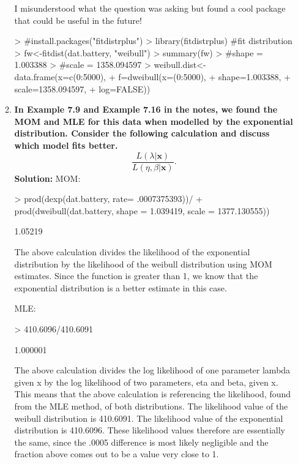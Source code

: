 \documentclass{article}
\begin{document}
\begin{enumerate}
\begin{enumerate}
I misunderstood what the question was asking but found a cool package that could be useful in the future!
\begin{Schunk}
\begin{Sinput}
> #install.packages("fitdistrplus")
> library(fitdistrplus) #fit distribution
> fw<-fitdist(dat.battery, "weibull")
> summary(fw)
> #shape = 1.003388
> #scale = 1358.094597
> weibull.dist<-data.frame(x=c(0:5000), 
+                          f=dweibull(x=(0:5000),
+                           shape=1.003388, 
+                           scale=1358.094597, 
+                           log=FALSE))
\end{Sinput}
\end{Schunk}
  \item \textbf{In Example 7.9 and Example 7.16 in the notes, we found the MOM and MLE
  for this data when modelled by the exponential distribution. Consider the following
  calculation and discuss which model fits better.}
  \[ \frac{L(\lambda|\mathbf{x})}{L(\eta,\beta|\mathbf{x})}.\]
  \textbf{Solution:}
  \newline
MOM:
\newline
\begin{Schunk}
\begin{Sinput}
> prod(dexp(dat.battery, rate= .0007375393))/
+   prod(dweibull(dat.battery, shape = 1.039419, scale = 1377.130555))
\end{Sinput}
\begin{Soutput}
[1] 1.05219
\end{Soutput}
\end{Schunk}
The above calculation divides the likelihood of the exponential distribution by the likelihood of the weibull distribution using MOM estimates. Since the function is greater than 1, we know that the exponential distribution is a better estimate in this case. 

MLE:
\begin{Schunk}
\begin{Sinput}
> 410.6096/410.6091
\end{Sinput}
\begin{Soutput}
[1] 1.000001
\end{Soutput}
\end{Schunk}
The above calculation divides the log likelihood of one parameter lambda given x by the log likelihood of two parameters, eta and beta, given x. This means that the above calculation is referencing the likelihood, found from the MLE method, of both distributions. The likelihood value of the weibull distribution is 410.6091. The likelihood value of the exponential distribution is 410.6096. These likelihood values therefore are essentially the same, since the .0005 difference is most likely negligible and the fraction above comes out to be a value very close to 1.
  

\end{enumerate}
\end{enumerate}
\end{document}
